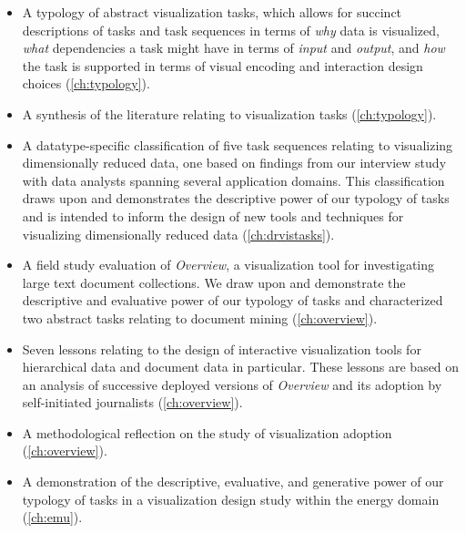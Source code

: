 \begin{itemize}
    \item A typology of abstract visualization tasks, which allows for succinct descriptions of tasks and task sequences in terms of {\it why} data is visualized, {\it what} dependencies a task might have in terms of {\it input} and {\it output}, and {\it how} the task is supported in terms of visual encoding and interaction design choices (\autoref{ch:typology}).
    \item A synthesis of the literature relating to visualization tasks (\autoref{ch:typology}).
    \item A datatype-specific classification of five task sequences relating to visualizing dimensionally reduced data, one based on findings from our interview study with data analysts spanning several application domains. This classification draws upon and demonstrates the descriptive power of our typology of tasks and is intended to inform the design of new tools and techniques for visualizing dimensionally reduced data (\autoref{ch:drvistasks}).
    \item A field study evaluation of {\it Overview}, a visualization tool for investigating large text document collections. We draw upon and demonstrate the descriptive and evaluative power of our typology of tasks and characterized two abstract tasks relating to document mining (\autoref{ch:overview}). 
    \item Seven lessons relating to the design of interactive visualization tools for hierarchical data and document data in particular. These lessons are based on an analysis of successive deployed versions of {\it Overview} and its adoption by self-initiated journalists (\autoref{ch:overview}).
    \item A methodological reflection on the study of visualization adoption (\autoref{ch:overview}).
    \item A demonstration of the descriptive, evaluative, and generative power of our typology of tasks in a visualization design study within the energy domain (\autoref{ch:emu}).

\end{itemize}

